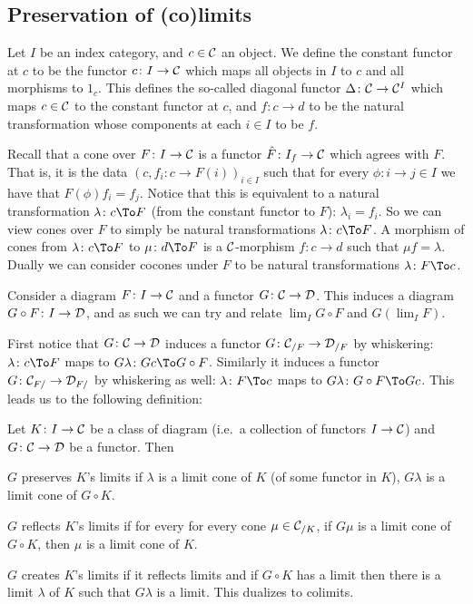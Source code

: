 \ecoro

\subsection{Preservation of (co)limits}

\bdefn

    Let $I$ be an index category, and $c\in{{\cal C}}$ an object.
    We define the {\emphcolor constant functor} at $c$ to be the functor $c\colon I\to{{\cal C}}$ which maps all objects in $I$ to $c$ and all morphisms to $1_c$.
    This defines the so-called {\emphcolor diagonal functor} $\Delta\colon{{\cal C}}\to{{\cal C}}^I$ which maps $c\in{{\cal C}}$ to the constant functor at $c$, and $f\colon c\to d$ to be the natural
    transformation whose components at each $i\in I$ to be $f$.

\edefn

Recall that a cone over $F\colon I\to{{\cal C}}$ is a functor $\hat F\colon I_f\to{{\cal C}}$ which agrees with $F$.
That is, it is the data $(c,f_i\colon c\to F(i))_{i\in I}$ such that for every $\phi\colon i\to j\in I$ we have that $F(\phi)f_i=f_j$.
Notice that this is equivalent to a natural transformation $\lambda\colon c\To F$ (from the constant functor to $F$): $\lambda_i=f_i$.
So we can view cones over $F$ to simply be natural transformations $\lambda\colon c\To F$.
A morphism of cones from $\lambda\colon c\To F$ to $\mu\colon d\To F$ is a ${{\cal C}}$-morphism $f\colon c\to d$ such that $\mu f=\lambda$.
Dually we can consider cocones under $F$ to be natural transformations $\lambda\colon F\To c$.

Consider a diagram $F\colon I\to{{\cal C}}$ and a functor $G\colon{{\cal C}}\to{{\cal D}}$.
This induces a diagram $G\circ F\colon I\to{{\cal D}}$, and as such we can try and relate $\lim_IG\circ F$ and $G(\lim_IF)$.

First notice that $G\colon{{\cal C}}\to{{\cal D}}$ induces a functor $G\colon{{\cal C}}_{/F}\to{{\cal D}}_{/F}$ by whiskering: $\lambda\colon c\To F$ maps to $G\lambda\colon Gc\To G\circ F$.
Similarly it induces a functor $G\colon{{\cal C}}_{F/}\to{{\cal D}}_{F/}$ by whiskering as well: $\lambda\colon F\To c$ maps to $G\lambda\colon G\circ F\To Gc$.
This leads us to the following definition:

\bdefn

    Let $K\colon I\to{{\cal C}}$ be a class of diagram (i.e.\ a collection of functors $I\to{{\cal C}}$) and $G\colon{{\cal C}}\to{{\cal D}}$ be a functor.
    Then
    \benum
        \item $G$ {\emphcolor preserves} $K$'s limits if $\lambda$ is a limit cone of $K$ (of some functor in $K$), $G\lambda$ is a limit cone of $G\circ K$.
        \item $G$ {\emphcolor reflects} $K$'s limits if for every for every cone $\mu\in{{\cal C}}_{/K}$, if $G\mu$ is a limit cone of $G\circ K$, then $\mu$ is a limit cone of $K$.
        \item $G$ {\emphcolor creates} $K$'s limits if it reflects limits and if $G\circ K$ has a limit then there is a limit $\lambda$ of $K$ such that $G\lambda$ is a limit.
    \eenum
    This dualizes to colimits.

